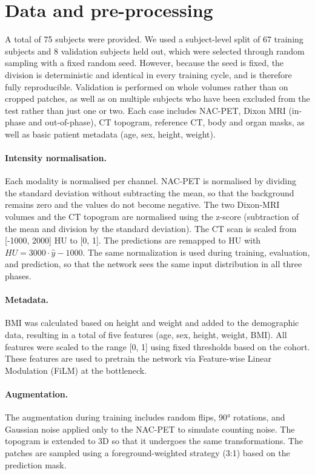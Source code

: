 \documentclass{article}
\begin{document}
\section{Data and pre-processing}
\label{sec:headings}

A total of 75 subjects were provided. We used a subject-level split of 67 training subjects and 8 validation subjects held out, which were selected through random sampling with a fixed random seed. However, because the seed is fixed, the division is deterministic and identical in every training cycle, and is therefore fully reproducible. 
Validation is performed on whole volumes rather than on cropped patches, as well as on multiple subjects who have been excluded from the test rather than just one or two. Each case includes NAC-PET, Dixon MRI (in-phase and out-of-phase), CT topogram, reference CT, body and organ masks, as well as basic patient metadata (age, sex, height, weight).

\paragraph{Intensity normalisation.}
Each modality is normalised per channel. NAC-PET is normalised by dividing the standard deviation without subtracting the mean, so that the background remains zero and the values do not become negative.
The two Dixon-MRI volumes and the CT topogram are normalised using the z-score (subtraction of the mean and division by the standard deviation).
The CT scan is scaled from [-1000, 2000] HU to [0, 1]. The predictions are remapped to HU with $HU = 3000 \cdot \hat{y} - 1000$.
The same normalization is used during training, evaluation, and prediction, so that the network sees the same input distribution in all three phases.

\paragraph{Metadata.}
BMI was calculated based on height and weight and added to the demographic data, resulting in a total of five features (age, sex, height, weight, BMI). 
All features were scaled to the range [0, 1] using fixed thresholds based on the cohort. These features are used to pretrain the network via  Feature-wise Linear Modulation (FiLM) \cite{perez2018film} at the bottleneck.

\paragraph{Augmentation.}
The augmentation during training includes random flips, 90° rotations, and Gaussian noise applied only to the NAC-PET to simulate counting noise. The topogram is extended to 3D so that it undergoes the same transformations. The patches are sampled using a foreground-weighted strategy (3:1) based on the prediction mask.
\end{document}

